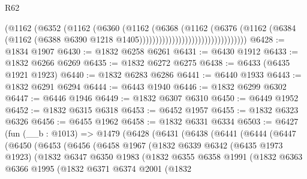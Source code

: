 \begin{lexlean}{R62}
\begin{coremodule}
                                              (@1162
                                                (@6352
                                                  (@1162
                                                    (@6360
                                                      (@1162
                                                        (@6368
                                                          (@1162
                                                            (@6376
                                                              (@1162
                                                                (@6384
                                                                  (@1162
                                                                    (@6388
                                                                      @6390
                                                                      @1218
                                                                      @1405)))))))))))))))))))))))))))))))))
@6428 := @1834 @1907
@6430 := @1832 @6258 @6261
@6431 := @6430 @1912
@6433 := @1832 @6266 @6269
@6435 := @1832 @6272 @6275
@6438 := @6433 (@6435 @1921 @1923)
@6440 := @1832 @6283 @6286
@6441 := @6440 @1933
@6443 := @1832 @6291 @6294
@6444 := @6443 @1940
@6446 := @1832 @6299 @6302
@6447 := @6446 @1946
@6449 := @1832 @6307 @6310
@6450 := @6449 @1952
@6452 := @1832 @6315 @6318
@6453 := @6452 @1957
@6455 := @1832 @6323 @6326
@6456 := @6455 @1962
@6458 := @1832 @6331 @6334
@6503 := @6427
    (fun (__b : @1013) =>
    @1479
      (@6428
        (@6431
          (@6438
            (@6441
              (@6444
                (@6447
                  (@6450
                    (@6453
                      (@6456
                        (@6458
                          @1967
                          (@1832
                            @6339
                            @6342
                            (@6435 @1973 @1923)
                            (@1832
                              @6347
                              @6350
                              @1983
                              (@1832
                                @6355
                                @6358
                                @1991
                                (@1832
                                  @6363
                                  @6366
                                  @1995
                                  (@1832
                                    @6371
                                    @6374
                                    @2001
                                    (@1832

\end{coremodule}
\end{lexlean}
